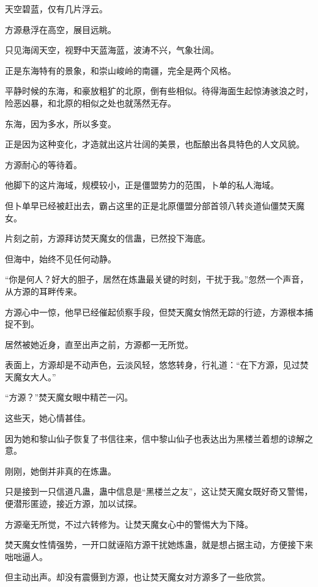 
\begin{this_body}

天空碧蓝，仅有几片浮云。

方源悬浮在高空，展目远眺。

只见海阔天空，视野中天蓝海蓝，波涛不兴，气象壮阔。

正是东海特有的景象，和崇山峻岭的南疆，完全是两个风格。

平静时候的东海，和豪放粗犷的北原，倒有些相似。待得海面生起惊涛骇浪之时，险恶凶暴，和北原的相似之处也就荡然无存。

东海，因为多水，所以多变。

正是因为这种变化，才造就出这片壮阔的美景，也酝酿出各具特色的人文风貌。

方源耐心的等待着。

他脚下的这片海域，规模较小，正是僵盟势力的范围，卜单的私人海域。

但卜单早已经被赶出去，霸占这里的正是北原僵盟分部首领八转炎道仙僵焚天魔女。

片刻之前，方源拜访焚天魔女的信蛊，已然投下海底。

但海中，始终不见任何动静。

“你是何人？好大的胆子，居然在炼蛊最关键的时刻，干扰于我。”忽然一个声音，从方源的耳畔传来。

方源心中一惊，他早已经催起侦察手段，但焚天魔女悄然无踪的行迹，方源根本捕捉不到。

居然被她近身，直至出声之前，方源都一无所觉。

表面上，方源却是不动声色，云淡风轻，悠悠转身，行礼道：“在下方源，见过焚天魔女大人。”

“方源？”焚天魔女眼中精芒一闪。

这些天，她心情甚佳。

因为她和黎山仙子恢复了书信往来，信中黎山仙子也表达出为黑楼兰着想的谅解之意。

刚刚，她倒并非真的在炼蛊。

只是接到一只信道凡蛊，蛊中信息是“黑楼兰之友”，这让焚天魔女既好奇又警惕，便潜形匿迹，接近方源，加以试探。

方源毫无所觉，不过六转修为。让焚天魔女心中的警惕大为下降。

焚天魔女性情强势，一开口就诬陷方源干扰她炼蛊，就是想占据主动，方便接下来咄咄逼人。

但主动出声。却没有震慑到方源，也让焚天魔女对方源多了一些欣赏。


\end{this_body}

